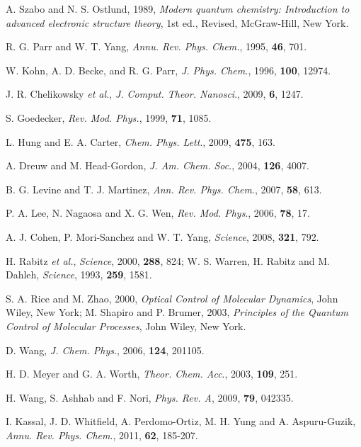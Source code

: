 \documentclass[8.5pt,twoside,twocolumn]{article}
\begin{document}
\begin{thebibliography}{99}
A. Szabo and N. S. Ostlund, 1989,
\emph{Modern quantum chemistry:
Introduction to advanced electronic structure theory},
1st ed., Revised,
McGraw-Hill, New York.

R. G. Parr and W. T. Yang, \emph{Annu. Rev. Phys. Chem.},
1995, \textbf{46}, 701.

W. Kohn, A. D. Becke, and R. G. Parr, \emph{J. Phys. Chem.},
1996, \textbf{100}, 12974.

J. R. Chelikowsky  \emph{et al.}, \emph{J. Comput. Theor. Nanosci}., 2009, \textbf{6}, 1247.

S. Goedecker, \emph{Rev. Mod. Phys.}, 1999, \textbf{71}, 1085.

L. Hung and E. A. Carter, \emph{Chem. Phys. Lett}., 2009, \textbf{475}, 163.

A. Dreuw and M. Head-Gordon, \emph{J. Am. Chem. Soc}., 2004, \textbf{126}, 4007.

B. G. Levine and T. J. Martinez, \emph{Ann. Rev. Phys. Chem}., 2007, \textbf{58}, 613.

P. A. Lee, N. Nagaosa and X. G. Wen, \emph{Rev. Mod. Phys}., 2006, \textbf{78}, 17.

A. J. Cohen, P. Mori-Sanchez and W. T. Yang, \emph{Science},
2008, \textbf{321}, 792.

H. Rabitz \emph{et al.}, \emph{Science}, 2000, \textbf{288}, 824; W. S. Warren, H. Rabitz and M. Dahleh, \emph{Science}, 1993, \textbf{259}, 1581.

S. A. Rice and M. Zhao, 2000, \emph{Optical Control of Molecular
Dynamics}, John Wiley, New York; M. Shapiro and P. Brumer, 2003,  \emph{Principles of the Quantum Control of
Molecular Processes}, John Wiley, New York.

D. Wang, \emph{J. Chem. Phys}., 2006, \textbf{124}, 201105.

H. D. Meyer and G. A. Worth, \emph{Theor. Chem. Acc}., 2003, \textbf{109}, 251.

H. Wang, S. Ashhab and F. Nori, \emph{Phys. Rev. A}, 2009, \textbf{79}, 042335.

I. Kassal, J. D. Whitfield, A. Perdomo-Ortiz, M. H. Yung and A. Aspuru-Guzik, \emph{Annu. Rev. Phys. Chem}., 2011, \textbf{62}, 185-207.


\end{thebibliography}
\end{document}

